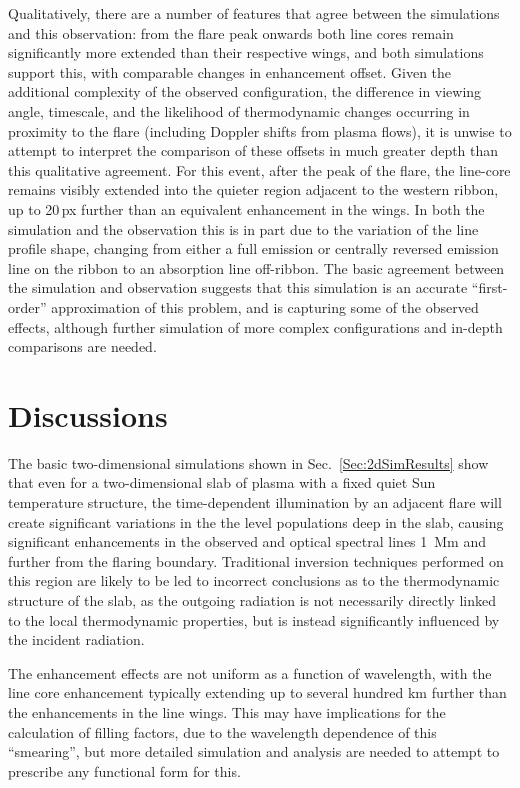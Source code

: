 Qualitatively, there are a number of features that agree between the simulations and this observation: from the flare peak onwards both line cores remain significantly more extended than their respective wings, and both simulations support this, with comparable changes in enhancement offset.
Given the additional complexity of the observed configuration, the difference in viewing angle, timescale, and the likelihood of thermodynamic changes occurring in proximity to the flare (including Doppler shifts from plasma flows), it is unwise to attempt to interpret the comparison of these offsets in much greater depth than this qualitative agreement.
For this event, after the peak of the flare, the line-core remains visibly extended into the quieter region adjacent to the western ribbon, up to 20\,{}px further than an equivalent enhancement in the wings.
In both the simulation and the observation this is in part due to the variation of the line profile shape, changing from either a full emission or centrally reversed emission line on the ribbon to an absorption line off-ribbon.
The basic agreement between the simulation and observation suggests that this simulation is an accurate ``first-order'' approximation of this problem, and is capturing some of the observed effects, although further simulation of more complex configurations and in-depth comparisons are needed.


\section{Discussions}

The basic two-dimensional simulations shown in Sec.~\ref{Sec:2dSimResults} show that even for a two-dimensional slab of plasma with a fixed quiet Sun temperature structure, the time-dependent illumination by an adjacent flare will create significant variations in the the level populations deep in the slab, causing significant enhancements in the observed \Ha{} and \CaLine{} optical spectral lines \SI{1}{\mega\metre} and further from the flaring boundary.
Traditional inversion techniques performed on this region are likely to be led to incorrect conclusions as to the thermodynamic structure of the slab, as the outgoing radiation is not necessarily directly linked to the local thermodynamic properties, but is instead significantly influenced by the incident radiation.

The enhancement effects are not uniform as a function of wavelength, with the line core enhancement typically extending up to several hundred \si{\kilo\metre} further than the enhancements in the line wings.
This may have implications for the calculation of filling factors, due to the wavelength dependence of this ``smearing'', but more detailed simulation and analysis are needed to attempt to prescribe any functional form for this.

